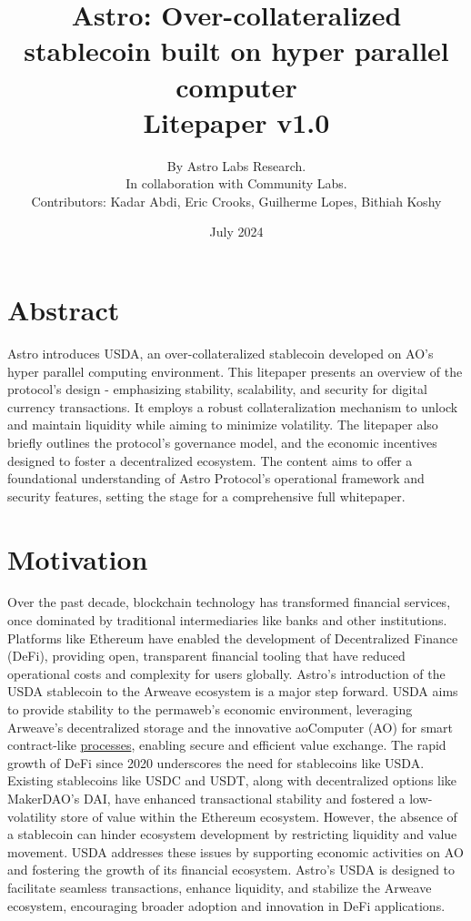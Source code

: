 \documentclass{article}
\title{\textbf{Astro: Over-collateralized stablecoin built on hyper parallel computer}\\Litepaper v1.0}
\author{
    By Astro Labs Research.\\
    In collaboration with Community Labs.\\[1em]
    Contributors: Kadar Abdi, Eric Crooks, Guilherme Lopes, Bithiah Koshy
}
\date{July 2024}
\begin{document}
\maketitle

\section*{Abstract}
Astro introduces USDA, an over-collateralized stablecoin developed on AO’s hyper parallel computing environment. This litepaper presents an overview of the protocol’s design - emphasizing stability, scalability, and security for digital currency transactions. It employs a robust collateralization mechanism to unlock and maintain liquidity while aiming to minimize volatility. The litepaper also briefly outlines the protocol’s governance model, and the economic incentives designed to foster a decentralized ecosystem. The content aims to offer a foundational understanding of Astro Protocol’s operational framework and security features, setting the stage for a comprehensive full whitepaper.

\section*{Motivation}
Over the past decade, blockchain technology has transformed financial services, once dominated by traditional intermediaries like banks and other institutions. Platforms like Ethereum have enabled the development of Decentralized Finance (DeFi), providing open, transparent financial tooling that have reduced operational costs and complexity for users globally.
Astro's introduction of the USDA stablecoin to the Arweave ecosystem is a major step forward. USDA aims to provide stability to the permaweb’s economic environment, leveraging Arweave's decentralized storage and the innovative aoComputer (AO) for smart contract-like \underline{processes}, enabling secure and efficient value exchange. The rapid growth of DeFi since 2020 underscores the need for stablecoins like USDA. Existing stablecoins like USDC and USDT, along with decentralized options like MakerDAO’s DAI, have enhanced transactional stability and fostered a low-volatility store of value within the Ethereum ecosystem. However, the absence of a stablecoin can hinder ecosystem development by restricting liquidity and value movement. USDA addresses these issues by supporting economic activities on AO and fostering the growth of its financial ecosystem. Astro’s USDA is designed to facilitate seamless transactions, enhance liquidity, and stabilize the Arweave ecosystem, encouraging broader adoption and innovation in DeFi applications.
\\
\\
\\
\\\\\\\\
\\
\tableofcontents
\newpage




\end{document}
